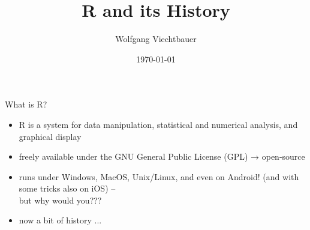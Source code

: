 \documentclass[t,12pt]{beamer}
\title{R and its History}
\date{\today}
\author{Wolfgang Viechtbauer}
\institute{Maastricht University}
\begin{document}
\maketitle


\begin{frame}{What is R?}

\begin{itemize}
   \item R is a system for data manipulation, statistical and numerical analysis, and graphical display
   \item freely available under the GNU General Public License (GPL) → open-source
   \item runs under Windows, MacOS, Unix/Linux, and even on Android! (and with some tricks also on iOS) -- \\ but why would you???
   \item now a bit of history ...
\end{itemize}

\end{frame}


{
\begin{frame}


\end{frame}
}

\end{document}
